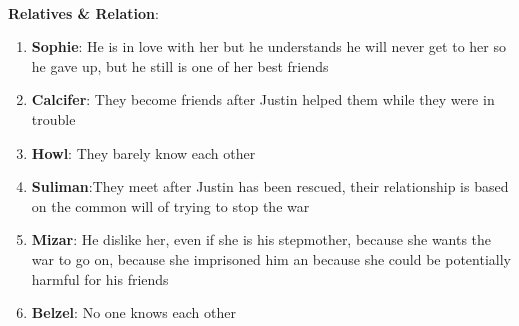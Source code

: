 



\\
\textbf{Relatives \& Relation}:
\begin{enumerate}
\item \textbf{Sophie}: He is in love with her but he understands he will never get to her so he gave up, but he still is one of her best friends
\item \textbf{Calcifer}: They become friends after Justin helped them while they were in trouble
\item \textbf{Howl}: They barely know each other
\item \textbf{Suliman}:They meet after Justin has been rescued, their relationship is based on the common will of trying to stop the war
             
\item \textbf{Mizar}: He dislike her, even if she is his stepmother, because she wants the war to go on, because she imprisoned him an because she could be potentially harmful for his friends
\item \textbf{Belzel}: No one knows each other
\end{enumerate}

